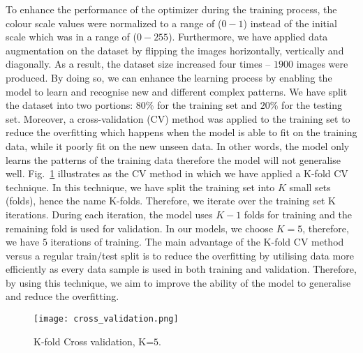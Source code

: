 To enhance the performance of the optimizer during the training process, the colour scale values were normalized to a range of (\(0-1\)) instead of the initial scale which was in a range of (\(0 - 255\)).	
Furthermore, we have applied data augmentation on the dataset by flipping the images horizontally, vertically and diagonally. 
As a result, the dataset size increased four times -- \(1900\)  images were produced.
By doing so, we can enhance the learning process by enabling the model to learn and recognise new and different complex patterns.
We have split the dataset into two portions:  \(80\%\) for the training set and \(20\%\) for the testing set.
Moreover, a cross-validation (CV) method was applied to the training set to reduce the overfitting which happens when the model is able to fit on the training data, while it poorly fit on the new unseen data.
In other words, the model only learns the patterns of the training data therefore the model will not generalise well. 
Fig.~\ref{fig:Cross_validation} illustrates as the CV method in which  we have applied a K-fold CV technique.
In this technique, we have split the training set into \(K\) small sets (folds), hence the name K-folds. 
Therefore, we iterate over the training set K iterations.
During each iteration, the model uses  \(K-1\) folds for training and the remaining fold is used for validation. 
In our models, we choose \(K=5\), therefore, we have \(5\) iterations of training. 
The main advantage of the K-fold CV method versus a regular train/test split is to reduce the overfitting by utilising data more efficiently as every data sample is used in both training and validation. 
Therefore, by using this technique, we aim to improve the ability of the model to generalise and reduce the overfitting.
\begin{figure}
	\centering
	\texttt{[image: cross\_validation.png]}
	\caption{K-fold Cross validation, K=\(5\).}
	\label{fig:Cross_validation}
\end{figure}
